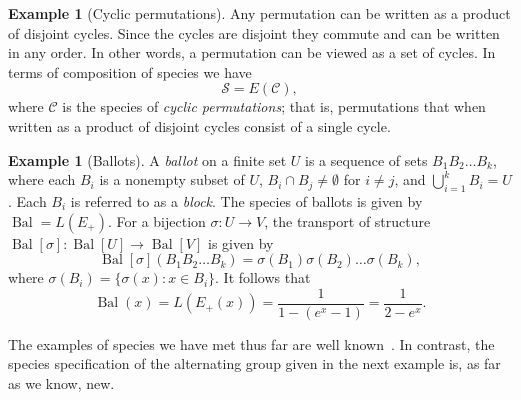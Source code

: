 \documentclass[a4paper, 11pt]{article}
\DeclareMathOperator{\Bal}{Bal}
\newcommand{\Cyc}{\mathcal{C}}
\newcommand{\Sym}{\mathcal{S}}
\theoremstyle{definition}
\newtheorem{example}[theorem]{Example}
\begin{document}
\begin{example}[Cyclic permutations]\label{example of cyclic permutations}
  Any permutation can be written as a product of disjoint cycles. Since
  the cycles are disjoint they commute and can be written in any
  order. In other words, a permutation can be viewed as a set of 
  cycles. In terms of composition of species we have
  \[
    \Sym = E(\Cyc),
  \]
  where $\Cyc$ is the species of \emph{cyclic permutations}; that is,
  permutations that when written as a product of disjoint cycles
  consist of a single cycle.
\end{example}

\begin{example}[Ballots]\label{example of ballots}
A \emph{ballot}
on a finite set $U$ is a sequence of sets $B_1B_2\ldots B_k$, where each 
$B_i$ is a nonempty subset of $U$, $B_i \cap B_j \neq \emptyset$ for 
$i \neq j$, and $\bigcup_{i=1}^k B_i = U$. Each $B_i$ is referred to as 
a \emph{block}. The species of ballots is given by $\Bal = L(E_+)$.
For a bijection $\sigma: U \to V$, the transport of structure
$\Bal[\sigma]: \Bal[U] \to \Bal[V]$ is given by
\[
\Bal[\sigma] (B_1B_2\ldots B_k ) = \sigma(B_1)\sigma(B_2)\ldots \sigma(B_k),
\]
where $\sigma(B_i)=\{\sigma(x) : x \in B_i\}$. It follows that
\[
\Bal(x) = L(E_+(x)) = \frac{1}{1-(e^x-1)} = \frac{1}{2-e^x}.
\]
\end{example}

The examples of species we have met thus far are well known~\cite{holybook}.
In contrast, the species specification of the alternating group given in
the next example is, as far as we know, new.
\end{document}
